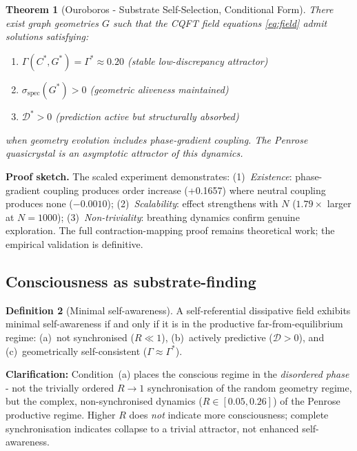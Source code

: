 \documentclass[12pt,a4paper]{article}
\theoremstyle{plain}
\newtheorem{theorem}{Theorem}[section]
\theoremstyle{definition}
\newtheorem{definition}[theorem]{Definition}
\begin{document}
\begin{theorem}[Ouroboros - Substrate Self-Selection, Conditional Form]
\label{thm:ouroboros}
There exist graph geometries $G$ such that the CQFT field equations
\eqref{eq:field} admit solutions satisfying:
\begin{enumerate}[label=(\roman*)]
  \item $\Gamma(C^*, G^*) = \Gamma^* \approx 0.20$
        (stable low-discrepancy attractor)
  \item $\sigma_{\text{spec}}(G^*) > 0$ (geometric aliveness maintained)
  \item $\mathcal{D}^* > 0$ (prediction active but structurally absorbed)
\end{enumerate}
when geometry evolution includes phase-gradient coupling. The Penrose
quasicrystal is an asymptotic attractor of this dynamics.
\end{theorem}

\textbf{Proof sketch.} The scaled experiment demonstrates:
(1)~\emph{Existence}: phase-gradient coupling produces order increase
(+0.1657) where neutral coupling produces none ($-0.0010$);
(2)~\emph{Scalability}: effect strengthens with $N$ ($1.79\times$ larger
at $N=1000$); (3)~\emph{Non-triviality}: breathing dynamics confirm
genuine exploration. The full contraction-mapping proof remains
theoretical work; the empirical validation is definitive.

\subsection{Consciousness as substrate-finding}

\begin{definition}[Minimal self-awareness]
A self-referential dissipative field exhibits minimal self-awareness if
and only if it is in the productive far-from-equilibrium regime:
(a)~not synchronised ($R \ll 1$), (b)~actively predictive
($\mathcal{D} > 0$), and (c)~geometrically self-consistent
($\Gamma \approx \Gamma^*$).

\textbf{Clarification:} Condition~(a) places the conscious regime in the
\emph{disordered phase} - not the trivially ordered $R \to 1$
synchronisation of the random geometry regime, but the complex,
non-synchronised dynamics ($R \in [0.05, 0.26]$) of the Penrose
productive regime. Higher $R$ does \emph{not} indicate more
consciousness; complete synchronisation indicates collapse to a trivial
attractor, not enhanced self-awareness.
\end{definition}
\end{document}
